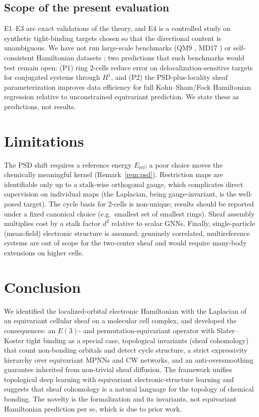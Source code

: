 \documentclass[pdflatex,sn-mathphys-num]{sn-jnl}%
\theoremstyle{thmstyleone}
\theoremstyle{thmstyletwo}
\theoremstyle{thmstylethree}
\begin{document}
\subsection{Scope of the present evaluation}
E1--E3 are exact validations of the theory, and E4 is a controlled study on
synthetic tight-binding targets chosen so that the directional content is
unambiguous. We have not run large-scale benchmarks (QM9 \cite{qm9},
MD17 \cite{md17}) or self-consistent Hamiltonian datasets \cite{phisnet,qhnet};
two predictions that such benchmarks would test remain open: (P1) ring $2$-cells
reduce error on delocalization-sensitive targets for conjugated systems through
$H^1$, and (P2) the PSD-plus-locality sheaf parameterization improves data
efficiency for full Kohn--Sham/Fock Hamiltonian regression relative to
unconstrained equivariant prediction. We state these as predictions, not results.

\section{Limitations}\label{sec:limits}

The PSD shift requires a reference energy $E_{\mathrm{ref}}$; a poor choice moves
the chemically meaningful kernel (Remark~\ref{rem:psd}). Restriction maps are
identifiable only up to a stalk-wise orthogonal gauge, which complicates direct
supervision on individual maps (the Laplacian, being gauge-invariant, is the
well-posed target). The cycle basis for $2$-cells is non-unique; results should be
reported under a fixed canonical choice (e.g.\ smallest set of smallest rings).
Sheaf assembly multiplies cost by a stalk factor $d^2$ relative to scalar GNNs.
Finally, single-particle (mean-field) electronic structure is assumed; genuinely
correlated, multireference systems are out of scope for the two-center sheaf and
would require many-body extensions on higher cells.

\section{Conclusion}\label{sec:conclusion}

We identified the localized-orbital electronic Hamiltonian with the Laplacian of
an equivariant cellular sheaf on a molecular cell complex, and developed the
consequences: an $E(3)$- and permutation-equivariant operator with Slater--Koster
tight binding as a special case, topological invariants (sheaf cohomology) that
count non-bonding orbitals and detect cycle structure, a strict expressivity
hierarchy over equivariant MPNNs and CW networks, and an anti-oversmoothing
guarantee inherited from non-trivial sheaf diffusion. The framework unifies
topological deep learning with equivariant electronic-structure learning and
suggests that sheaf cohomology is a natural language for the topology of chemical
bonding. The novelty is the formalization and its invariants, not equivariant
Hamiltonian prediction per se, which is due to prior work.
\end{document}
